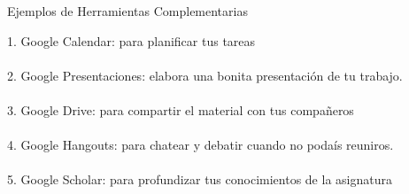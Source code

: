 \documentclass[10pt]{beamer}
\begin{document}
\begin{frame}{Ejemplos de Herramientas Complementarias}{}

1. Google Calendar: para planificar tus tareas\\ \ \\
2. Google Presentaciones: elabora una bonita presentación de tu trabajo.\\ \ \\
3. Google Drive: para compartir el material con tus compañeros\\ \ \\
4. Google Hangouts: para chatear y debatir cuando no podaís reuniros.\\ \ \\
5. Google Scholar: para profundizar tus conocimientos de la asignatura\\ \ \\

\end{frame}
\end{document}
